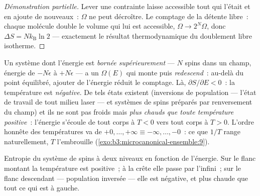 \begin{proof}[Démonstration partielle]
Lever une contrainte laisse accessible tout  qui l'était et
en ajoute de nouveaux~: $\Omega$ ne peut décroître. Le comptage de la
détente libre~: chaque molécule double le volume qui lui est
accessible, $\Omega \to 2^N\Omega$, donc $\Delta S = Nk_{\text{B}}\ln2$
--- exactement le résultat thermodynamique du doublement libre
isotherme.
\end{proof}

\begin{example}\label{ex:b3:microcanonical-ensemble:negative}
Un système dont l'énergie est \emph{bornée supérieurement} --- $N$
spins dans un champ, énergie de $-N\epsilon$ à $+N\epsilon$ --- a un
$\Omega(E)$ qui monte puis \emph{redescend}~: au-delà du point
équilibré, ajouter de l'énergie réduit le comptage. Là,
$\partial S/\partial E < 0$~: la température est \emph{négative}. De
tels états existent (inversions de population --- l'état de travail de
tout milieu laser --- et systèmes de spins préparés par renversement
du champ) et ils ne sont pas froids mais \emph{plus chauds que toute
température positive}~: l'énergie s'écoule de tout corps à $T < 0$
vers tout corps à $T > 0$. L'ordre honnête des températures va de
$+0, \dots, +\infty \equiv -\infty, \dots, -0$~: ce que $1/T$ range
naturellement, $T$ l'embrouille
(\cref{exo:b3:microcanonical-ensemble:9}).
\end{example}

\begin{omfigure}

{\small Entropie du système de spins à deux niveaux en fonction de
l'énergie. Sur le flanc montant la température est positive~; à la
crête elle passe par l'infini~; sur le flanc descendant --- population
inversée --- elle est négative, et plus chaude que tout ce qui est à
gauche.}
\end{omfigure}

